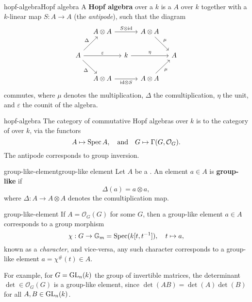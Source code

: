 \begin{topic}{hopf-algebra}{Hopf algebra}
    A \textbf{Hopf algebra} over a  $k$ is a  $A$ over $k$ together with a $k$-linear map $S : A \to A$ (the \textit{antipode}), such that the diagram
    \[ \begin{tikzcd}[column sep=1em, row sep=2em] & A \otimes A \arrow{rr}{S \otimes \id} && A \otimes A \arrow{dr}{\mu} & \\ A \arrow{rr}{\varepsilon} \arrow{ur}{\Delta} \arrow[swap]{dr}{\Delta} && k \arrow{rr}{\eta} && A \\ & A \otimes A \arrow[swap]{rr}{\id \otimes S} && A \otimes A \arrow[swap]{ur}{\mu} &  \end{tikzcd} \]
    commutes, where $\mu$ denotes the multiplication, $\Delta$ the comultiplication, $\eta$ the unit, and $\varepsilon$ the counit of the algebra.
\end{topic}

\begin{example}{hopf-algebra}
    The category of commutative  Hopf algebras over $k$ is  to the category of   over $k$, via the functors
    \[ A \mapsto \operatorname{Spec} A, \quad \text{and} \quad G \mapsto \Gamma(G, \mathcal{O}_G) . \]
    The antipode corresponds to group inversion.
\end{example}

\begin{topic}{group-like-element}{group-like element}
    Let $A$ be a . An element $a \in A$ is \textbf{group-like} if
    \[ \Delta(a) = a \otimes a , \]
    where $\Delta : A \to A \otimes A$ denotes the comultiplication map.
\end{topic}

\begin{example}{group-like-element}
    If $A = \mathcal{O}_G(G)$ for some  $G$, then a group-like element $a \in A$ corresponds to a group morphism
    \[ \chi : G \to \mathbb{G}_m = \operatorname{Spec}(k[t, t^{-1}]), \quad t \mapsto a , \]
    known as a \textit{character}, and vice-versa, any such character corresponds to a group-like element $a = \chi^\#(t) \in A$.
    
    For example, for $G = \textup{GL}_n(k)$ the group of invertible matrices, the determinant $\det \in \mathcal{O}_G(G)$ is a group-like element, since $\det(AB) = \det(A) \det(B)$ for all $A, B \in \textup{GL}_n(k)$.
\end{example}

